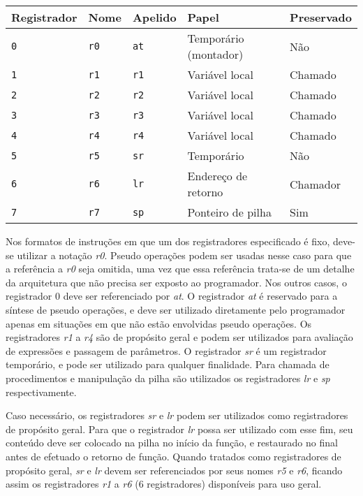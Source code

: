 \documentclass{extreport}
\begin{document}
\begin{table}[ht!]
\centering
\begin{tabular}{|p{2.5cm}|p{1.6cm}|p{1.6cm}|p{4.3cm}|p{2.5cm}|}
\hline
\bf{Registrador} & \bf{Nome} & \bf{Apelido} & \bf{Papel} & \bf{Preservado} \\ \hline \hline
\texttt{0}	& \texttt{r0}	& \texttt{at}	& Temporário (montador) & Não \\ \hline
\texttt{1}	& \texttt{r1}	& \texttt{r1}	& Variável local & Chamado \\ \hline
\texttt{2}	& \texttt{r2}	& \texttt{r2}	& Variável local & Chamado \\ \hline
\texttt{3}	& \texttt{r3}	& \texttt{r3}	& Variável local & Chamado \\ \hline
\texttt{4}	& \texttt{r4}	& \texttt{r4}	& Variável local & Chamado \\ \hline
\texttt{5}	& \texttt{r5}	& \texttt{sr}	& Temporário & Não \\ \hline
\texttt{6}	& \texttt{r6}	& \texttt{lr}	& Endereço de retorno & Chamador \\ \hline
\texttt{7}	& \texttt{r7}	& \texttt{sp}	& Ponteiro de pilha & Sim \\ \hline
\end{tabular}
\end{table}

Nos formatos de instruções em que um dos registradores especificado é fixo, deve-se utilizar a notação \textit{r0}. Pseudo operações podem ser usadas nesse caso para que a referência a \textit{r0} seja omitida, uma vez que essa referência trata-se de um detalhe da arquitetura que não precisa ser exposto ao programador. Nos outros casos, o registrador 0 deve ser referenciado por \textit{at}. O registrador \textit{at} é reservado para a síntese de pseudo operações, e deve ser utilizado diretamente pelo programador apenas em situações em que não estão envolvidas pseudo operações. Os registradores \textit{r1} a \textit{r4} são de propósito geral e podem ser utilizados para avaliação de expressões e passagem de parâmetros. O registrador \textit{sr} é um registrador temporário, e pode ser utilizado para qualquer finalidade. Para chamada de procedimentos e manipulação da pilha são utilizados os registradores \textit{lr} e \textit{sp} respectivamente.

Caso necessário, os registradores \textit{sr} e \textit{lr} podem ser utilizados como registradores de propósito geral. Para que o registrador \textit{lr} possa ser utilizado com esse fim, seu conteúdo deve ser colocado na pilha no início da função, e restaurado no final antes de efetuado o retorno de função. Quando tratados como registradores de propósito geral, \textit{sr} e \textit{lr} devem ser referenciados por seus nomes \textit{r5} e \textit{r6}, ficando assim os registradores \textit{r1} a \textit{r6} (6 registradores) disponíveis para uso geral.
\end{document}
